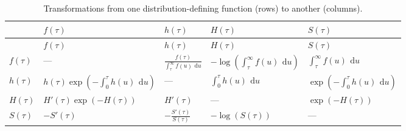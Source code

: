 \documentclass[
  letterpaper,
  krantz2]{style/krantz}
\begin{document}
\begin{longtable}[]{@{}
  >{\raggedright\arraybackslash}p{}
  >{\raggedright\arraybackslash}p{}
  >{\raggedright\arraybackslash}p{}
  >{\raggedright\arraybackslash}p{}
  >{\raggedright\arraybackslash}p{}@{}}
\caption{Transformations from one distribution-defining function (rows)
to another (columns).}\label{tbl-dist-transformations}\tabularnewline
\toprule\noalign{}
\begin{minipage}[b]{\linewidth}\raggedright
\end{minipage} & \begin{minipage}[b]{\linewidth}\raggedright
\(f(\tau)\)
\end{minipage} & \begin{minipage}[b]{\linewidth}\raggedright
\(h(\tau)\)
\end{minipage} & \begin{minipage}[b]{\linewidth}\raggedright
\(H(\tau)\)
\end{minipage} & \begin{minipage}[b]{\linewidth}\raggedright
\(S(\tau)\)
\end{minipage} \\
\midrule\noalign{}
\endfirsthead
\toprule\noalign{}
\begin{minipage}[b]{\linewidth}\raggedright
\end{minipage} & \begin{minipage}[b]{\linewidth}\raggedright
\(f(\tau)\)
\end{minipage} & \begin{minipage}[b]{\linewidth}\raggedright
\(h(\tau)\)
\end{minipage} & \begin{minipage}[b]{\linewidth}\raggedright
\(H(\tau)\)
\end{minipage} & \begin{minipage}[b]{\linewidth}\raggedright
\(S(\tau)\)
\end{minipage} \\
\midrule\noalign{}
\endhead
\bottomrule\noalign{}
\endlastfoot
\(f(\tau)\) & --- &
\(\frac{f(\tau)}{\int^\infty_\tau f(u)\ \,\mathrm{d}u}\) &
\(-\log\left(\int^\infty_\tau f(u)\ \,\mathrm{d}u\right)\) &
\(\int^\infty_\tau f(u)\ \,\mathrm{d}u\) \\
\(h(\tau)\) &
\(h(\tau)\exp\left(-\int_0^\tau h(u)\ \,\mathrm{d}u\right)\) & --- &
\(\int_0^\tau h(u)\ \,\mathrm{d}u\) &
\(\exp\left(-\int_0^\tau h(u)\ \,\mathrm{d}u\right)\) \\
\(H(\tau)\) & \(H'(\tau)\exp(-H(\tau))\) & \(H'(\tau)\) & --- &
\(\exp(-H(\tau))\) \\
\(S(\tau)\) & \(-S'(\tau)\) & \(-\frac{S'(\tau)}{S(\tau)}\) &
\(-\log(S(\tau))\) & --- \\
\end{longtable}
\end{document}
